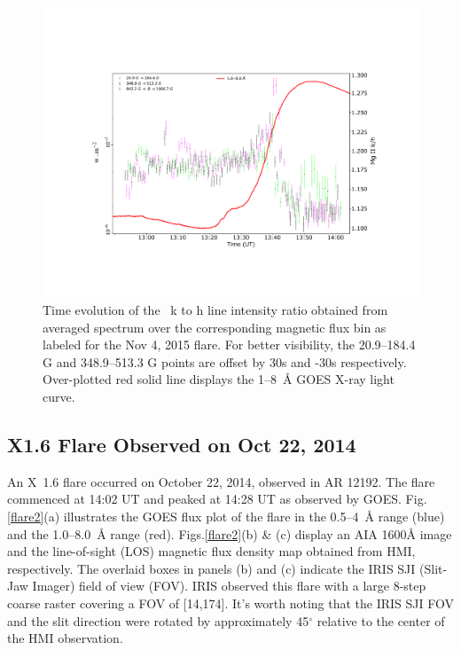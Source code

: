 \begin{figure}[ht!]
    \centering
    \includegraphics[trim={3cm 3cm 2cm 4cm},clip,width=\textwidth]{Figures/Nov-11-2015-optical-dep-ev-5.pdf}
    \caption[Time evolution of the ~k to h line intensity ratio obtained from averaged spectrum over the corresponding magnetic flux bin.]{Time evolution of the ~k to h line intensity ratio obtained from averaged spectrum over the corresponding magnetic flux bin as labeled for the Nov 4, 2015 flare. For better visibility, the 20.9{--}184.4 G and 348.9{--}513.3 G points are offset by 30s and -30s respectively. Over-plotted red solid line displays the 1{--}8~{\AA} GOES X-ray light curve.}
    \label{fig:optical_dep_ev_m}
\end{figure}

\subsection{X1.6 Flare Observed on Oct 22, 2014}

An X~1.6 flare occurred on October 22, 2014, observed in AR 12192. The flare commenced at 14:02 UT and peaked at 14:28 UT as observed by GOES. Fig.\ref{flare2}(a) illustrates the GOES flux plot of the flare in the 0.5{--}4~{\AA} range (blue) and the 1.0{--}8.0~{\AA} range (red). Figs.\ref{flare2}(b) \& (c) display an AIA 1600{\AA} image and the line-of-sight (LOS) magnetic flux density map obtained from HMI, respectively. The overlaid boxes in panels (b) and (c) indicate the IRIS SJI (Slit-Jaw Imager) field of view (FOV). IRIS observed this flare with a large 8-step coarse raster covering a FOV of [14\arcsec,174\arcsec]. It's worth noting that the IRIS SJI FOV and the slit direction were rotated by approximately 45$^\circ$ relative to the center of the HMI observation.

